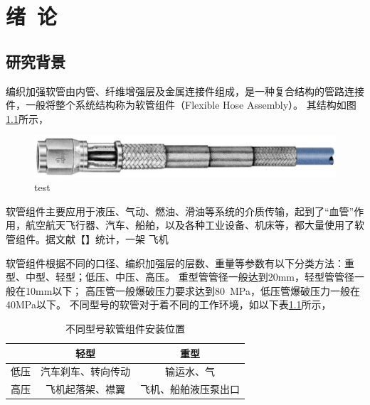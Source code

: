 


\chapter{绪~论}
\label{chap:introduintroduction}
\section{研究背景}
编织加强软管由内管、纤维增强层及金属连接件组成，是一种复合结构的管路连接件，一般将整个系统结构称为软管组件（Flexible Hose Assembly）。
其结构如图\ref{fig:hose structure}所示，

\begin{figure}[!htbp]
\centering
\includegraphics[width=1.0\linewidth]{figure/chap1/R157-R154-HOSE1}
\caption{test}
\label{fig:hose structure}
\end{figure}


软管组件主要应用于液压、气动、燃油、滑油等系统的介质传输，起到了“血管”作用，航空航天飞行器、汽车、船舶，以及各种工业设备、机床等，都大量使用了软管组件。据文献【】统计，一架  飞机




软管组件根据不同的口径、编织加强层的层数、重量等参数有以下分类方法：重型、中型、轻型；低压、中压、高压。
重型管管径一般达到20mm，轻型管管径一般在10mm以下；
高压管一般爆破压力要求达到\SI{80}{\mega\pascal}，低压管爆破压力一般在40MPa以下。
不同型号的软管对于着不同的工作环境，如以下表\ref{tab:hosefixposition}所示，




\begin{table}[!htbp]
	\centering
	\caption{不同型号软管组件安装位置}\label{tab:hosefixposition}
		
	\begin{tabular}{ccc}
		\toprule
		&    轻型     &     重型     \\ \hline
		低压 & 汽车刹车、转向传动 &  输运水、气  \\
		高压 & 飞机起落架、襟翼  & 飞机、船舶液压泵出口 \\ 
		\bottomrule
	\end{tabular} 
\end{table}

